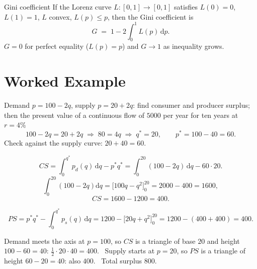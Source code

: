 \begin{rulebox}{Gini coefficient}
If the Lorenz curve $L:[0,1]\to[0,1]$ satisfies $L(0)=0$, $L(1)=1$, $L$
convex, $L(p)\le p$, then the Gini coefficient is
\[
  G \;=\; 1-2\int_{0}^{1} L(p)\,\mathrm{d}p .
\]
$G=0$ for perfect equality ($L(p)=p$) and $G\to 1$ as inequality grows.
\end{rulebox}

\section{Worked Example}

\begin{worked}{Demand $p=100-2q$, supply $p=20+2q$: find consumer and producer surplus; then the present value of a continuous flow of $5000$ per year for ten years at $r=4\%$}
\[
  100-2q=20+2q
  \;\Longrightarrow\;
  80=4q
  \;\Longrightarrow\;
  q^{*}=20,\qquad p^{*}=100-40=60 .
\]
Check against the supply curve: $20+40=60$. \checkmark

\[
  CS=\int_{0}^{q^{*}}p_{d}(q)\,\mathrm{d}q-p^{*}q^{*}
  =\int_{0}^{20}(100-2q)\,\mathrm{d}q-60\cdot20 .
\]
\[
  \int_{0}^{20}(100-2q)\mathrm{d}q=\bigl[100q-q^{2}\bigr]_{0}^{20}=2000-400=1600 ,
\]
\[
  CS=1600-1200=\boxed{400}.
\]

\[
  PS=p^{*}q^{*}-\int_{0}^{q^{*}}p_{s}(q)\,\mathrm{d}q
  =1200-\bigl[20q+q^{2}\bigr]_{0}^{20}
  =1200-(400+400)=\boxed{400}.
\]

Demand meets the axis at $p=100$, so $CS$ is a triangle of base $20$ and
height $100-60=40$: $\tfrac12\cdot20\cdot40=400$. \checkmark\ Supply starts
at $p=20$, so $PS$ is a triangle of height $60-20=40$: also $400$.
\checkmark\ Total surplus $800$.


\end{worked}
